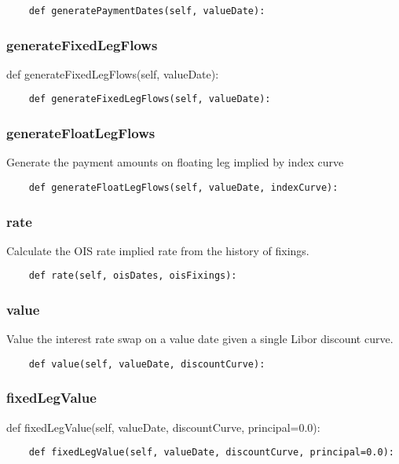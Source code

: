 \documentclass[twoside,11pt]{book}
\begin{document}
\begin{lstlisting}
    def generatePaymentDates(self, valueDate):
\end{lstlisting}

\subsubsection*{{\bf generateFixedLegFlows}}
def generateFixedLegFlows(self, valueDate): 

\begin{lstlisting}
    def generateFixedLegFlows(self, valueDate):
\end{lstlisting}

\subsubsection*{{\bf generateFloatLegFlows}}
Generate the payment amounts on floating leg implied by index curve  

\begin{lstlisting}
    def generateFloatLegFlows(self, valueDate, indexCurve):
\end{lstlisting}

\subsubsection*{{\bf rate}}
Calculate the OIS rate implied rate from the history of fixings.  

\begin{lstlisting}
    def rate(self, oisDates, oisFixings):
\end{lstlisting}

\subsubsection*{{\bf value}}
Value the interest rate swap on a value date given a single Libor discount curve.  

\begin{lstlisting}
    def value(self, valueDate, discountCurve):
\end{lstlisting}

\subsubsection*{{\bf fixedLegValue}}
def fixedLegValue(self, valueDate, discountCurve, principal=0.0): 

\begin{lstlisting}
    def fixedLegValue(self, valueDate, discountCurve, principal=0.0):
\end{lstlisting}
\end{document}
